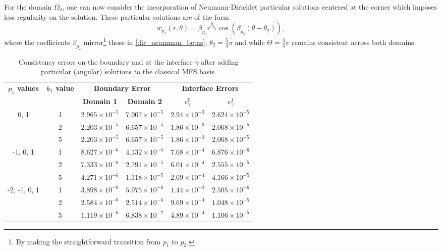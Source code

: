 \documentclass[5p,authoryear]{elsarticle}
\begin{document}
For the domain \(\Omega_2\), one can now consider the incorporation of Neumann-Dirichlet particular solutions centered at the corner which imposes less regularity on the solution. These particular solutions are of the form
\[
w_{p_2}(r,\theta) = \beta_{p_2} r^{\beta_{p_2}}\cos(\beta_{p_2}(\theta-\theta_2)),
\]
where the coefficients \(\beta_{p_2}\) mirror\footnote{By making the straightforward transition from \(p_1\) to \(p_2\).} those in \eqref{dir_neumman_betas}, \(\theta_2=\frac{5}{4}\pi\) and while \(\Theta = \frac{3}{4}\pi\) remains consistent across both domains.
\begin{table}[!htbp]
    \centering
    \footnotesize %
    \setlength{\tabcolsep}{1pt} %
    \begin{tabular}{cccccc}
        \toprule
        \multicolumn{1}{c}{\textbf{\(p_1\) values}} & \multicolumn{1}{c}{\textbf{\(k_1\) value}} & \multicolumn{2}{c}{\textbf{Boundary Error}} & \multicolumn{2}{c}{\textbf{Interface Errors}} \\
        \cmidrule(lr){2-2} \cmidrule(lr){3-4} \cmidrule(lr){5-6}
        & & \textbf{Domain 1} & \textbf{Domain 2} & \textbf{\(e_\gamma^0\)} & \textbf{\(e_\gamma^1\)} \\
        \midrule

        0, 1 & 1 & $2.965\times10^{-5}$ & $7.907\times10^{-5}$ & $2.94\times10^{-3}$ & $2.624\times10^{-5}$ \\
        & 2 & $2.203\times10^{-5}$ & $6.657\times10^{-5}$ & $1.86\times10^{-3}$ & $2.068\times10^{-5}$ \\
        & 5 & $2.203\times10^{-5}$ & $6.657\times10^{-5}$ & $1.86\times10^{-3}$ & $2.068\times10^{-5}$ \\
        \midrule

        -1, 0, 1 & 1 & $8.627\times10^{-6}$ & $4.132\times10^{-5}$ & $7.68\times10^{-4}$ & $6.876\times10^{-6}$ \\
        & 2 & $7.333\times10^{-6}$ & $2.791\times10^{-5}$ & $6.01\times10^{-4}$ & $2.555\times10^{-5}$ \\
        & 5 & $4.271\times10^{-6}$ & $1.118\times10^{-5}$ & $2.69\times10^{-4}$ & $4.166\times10^{-5}$ \\
        \midrule

        -2, -1, 0, 1 & 1 & $3.898\times10^{-6}$ & $5.975\times10^{-6}$ & $1.44\times10^{-3}$ & $2.505\times10^{-6}$ \\
        & 2 & $2.584\times10^{-6}$ & $2.514\times10^{-6}$ & $9.69\times10^{-4}$ & $1.048\times10^{-5}$ \\
        & 5 & $1.119\times10^{-6}$ & $6.838\times10^{-7}$ & $4.89\times10^{-4}$ & $1.106\times10^{-5}$ \\
        \bottomrule
    \end{tabular}
    \caption{Consistency errors on the boundary and at the interface \(\gamma\) after adding particular (angular) solutions to the classical MFS basis.}
    \label{tab:transmission_results_L_shape_axis_particular}
\end{table}
\end{document}

